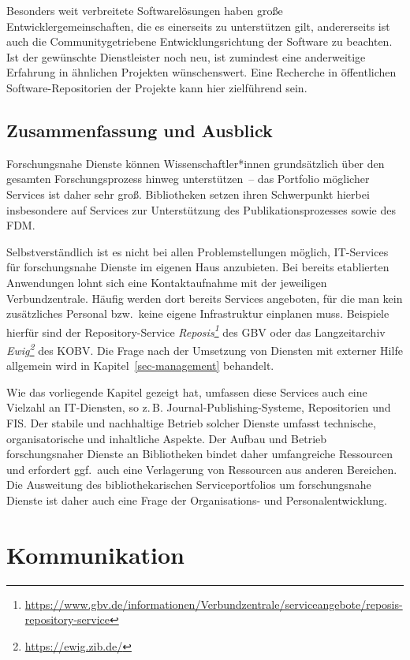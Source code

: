 \documentclass[
  11pt,
  letterpaper,
  DIV=11,
  twoside]{scrreprt}
\DeclareRobustCommand{\href}[2]{#2\footnote{\url{#1}}}
\begin{document}
Besonders weit verbreitete Softwarelösungen haben große
Entwicklergemeinschaften, die es einerseits zu unterstützen gilt,
andererseits ist auch die Communitygetriebene Entwicklungsrichtung der
Software zu beachten. Ist der gewünschte Dienstleister noch neu, ist
zumindest eine anderweitige Erfahrung in ähnlichen Projekten
wünschenswert. Eine Recherche in öffentlichen Software-Repositorien der
Projekte kann hier zielführend sein.

\section{Zusammenfassung und
Ausblick}\label{zusammenfassung-und-ausblick-5}

Forschungsnahe Dienste können Wissenschaftler*innen grundsätzlich über
den gesamten Forschungsprozess hinweg unterstützen~-- das Portfolio
möglicher Services ist daher sehr groß. Bibliotheken setzen ihren
Schwerpunkt hierbei insbesondere auf Services zur Unterstützung des
Publikationsprozesses sowie des FDM.

Selbstverständlich ist es nicht bei allen Problemstellungen möglich,
IT-Services für forschungsnahe Dienste im eigenen Haus anzubieten. Bei
bereits etablierten Anwendungen lohnt sich eine Kontaktaufnahme mit der
jeweiligen Verbundzentrale. Häufig werden dort bereits Services
angeboten, für die man kein zusätzliches Personal bzw.~keine eigene
Infrastruktur einplanen muss. Beispiele hierfür sind der
Repository-Service
\emph{\href{https://www.gbv.de/informationen/Verbundzentrale/serviceangebote/reposis-repository-service}{Reposis}}
des GBV oder das Langzeitarchiv \emph{\href{https://ewig.zib.de/}{Ewig}}
des KOBV. Die Frage nach der Umsetzung von Diensten mit externer Hilfe
allgemein wird in Kapitel~\ref{sec-management} behandelt.

Wie das vorliegende Kapitel gezeigt hat, umfassen diese Services auch
eine Vielzahl an IT-Diensten, so z.\,B. Journal-Publishing-Systeme,
Repositorien und {FIS}. Der stabile und nachhaltige Betrieb solcher
Dienste umfasst technische, organisatorische und inhaltliche Aspekte.
Der Aufbau und Betrieb forschungsnaher Dienste an Bibliotheken bindet
daher umfangreiche Ressourcen und erfordert ggf.~auch eine Verlagerung
von Ressourcen aus anderen Bereichen. Die Ausweitung des
bibliothekarischen Serviceportfolios um forschungsnahe Dienste ist daher
auch eine Frage der Organisations- und Personalentwicklung.


\chapter{Kommunikation}\label{sec-kommunikation}
\end{document}
